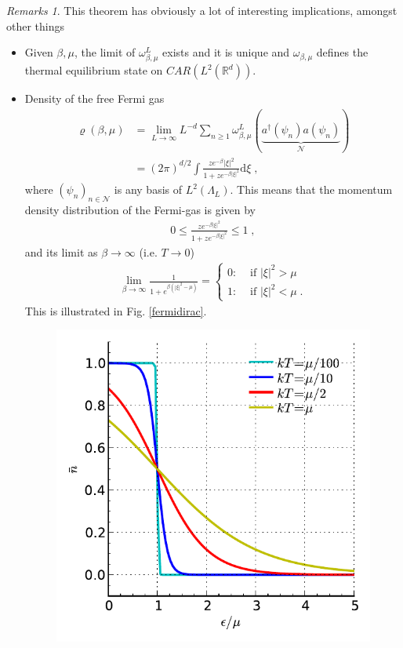 \documentclass[
a4paper, %
11pt, %
onecolumn, %
openany, %
]{memoir}
\theoremstyle{definition}
\theoremstyle{remark}
\newtheorem{remarks}[definition]{Remarks}
\theoremstyle{plain}
\begin{document}
\begin{remarks} This theorem has obviously a lot of interesting implications, amongst other things
	\begin{itemize}
		 \item Given $\beta,\mu$, the limit of $\omega_{\beta,\mu}^L$ exists and it is unique and $\omega_{\beta,\mu}$ defines the thermal equilibrium state on $CAR(L^2(\mathbb{R}^d))$.
		 \item Density of the free Fermi gas \begin{align}
		 \varrho(\beta,\mu)&=\lim_{L\rightarrow\infty}L^{-d}\sum_{n\geq 1} \omega_{\beta,\mu}^L(\underbrace{a^{\dagger}(\psi_n)a(\psi_n)}_{\mathcal{N}})\\
		 &=(2\pi)^{d/2}\int \frac{ze^{-\beta}|\xi|^2}{1+ze^{-\beta|\xi|^2}}\mathrm{d}\xi\; ,
		 \end{align}
		 where $(\psi_n)_{n\in\mathcal{N}}$ is any basis of $L^2(\Lambda_L)$. This means that the momentum density distribution of the Fermi-gas is given by\begin{align}
		 0\leq \frac{ze^{-\beta|\xi|^2}}{1+ze^{-\beta|\xi|^2}}\leq 1\; ,
		 \end{align}
		 and its limit as $\beta\rightarrow\infty$ (i.e. $T\rightarrow 0$) \begin{align}
		 \lim_{\beta\rightarrow \infty}\frac{1}{1+e^{\beta(|\xi|^2-\mu)}}=\begin{cases}
		 0 :& \text{ if }|\xi|^2 > \mu\\
		 1 :& \text{ if }|\xi|^2< \mu \; .
		 \end{cases}\label{eqn::limit_of_fermi_density}
		 \end{align}
		 This is illustrated in Fig. \ref{fermidirac}. \begin{figure}\centering
		 	\includegraphics[scale=1]{fermidirac.pdf}

\end{figure}
\end{itemize}
\end{remarks}
\end{document}
